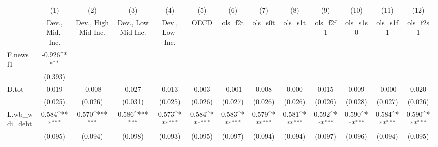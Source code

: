 {
\def\sym#1{\ifmmode^{#1}\else\(^{#1}\)\fi}
\begin{tabular}{l*{12}{c}}
\toprule
            &\multicolumn{1}{c}{(1)}&\multicolumn{1}{c}{(2)}&\multicolumn{1}{c}{(3)}&\multicolumn{1}{c}{(4)}&\multicolumn{1}{c}{(5)}&\multicolumn{1}{c}{(6)}&\multicolumn{1}{c}{(7)}&\multicolumn{1}{c}{(8)}&\multicolumn{1}{c}{(9)}&\multicolumn{1}{c}{(10)}&\multicolumn{1}{c}{(11)}&\multicolumn{1}{c}{(12)}\\
            &\multicolumn{1}{c}{Dev., Mid.-Inc.}&\multicolumn{1}{c}{Dev., High Mid-Inc.}&\multicolumn{1}{c}{Dev., Low Mid-Inc.}&\multicolumn{1}{c}{Dev., Low-Inc.}&\multicolumn{1}{c}{OECD}&\multicolumn{1}{c}{ols\_f2t}&\multicolumn{1}{c}{ols\_s0t}&\multicolumn{1}{c}{ols\_s1t}&\multicolumn{1}{c}{ols\_f2f1}&\multicolumn{1}{c}{ols\_s1s0}&\multicolumn{1}{c}{ols\_s1f1}&\multicolumn{1}{c}{ols\_f2s1}\\
\midrule
F.news\_f1   &      -0.926\sym{**} &                     &                     &                     &                     &                     &                     &                     &                     &                     &                     &                     \\
            &     (0.393)         &                     &                     &                     &                     &                     &                     &                     &                     &                     &                     &                     \\
\addlinespace
D.tot       &       0.019         &      -0.008         &       0.027         &       0.013         &       0.003         &      -0.001         &       0.008         &       0.000         &       0.015         &       0.009         &      -0.000         &       0.020         \\
            &     (0.025)         &     (0.026)         &     (0.031)         &     (0.025)         &     (0.026)         &     (0.027)         &     (0.026)         &     (0.026)         &     (0.026)         &     (0.028)         &     (0.027)         &     (0.026)         \\
\addlinespace
L.wb\_wdi\_debt&       0.584\sym{***}&       0.570\sym{***}&       0.586\sym{***}&       0.573\sym{***}&       0.584\sym{***}&       0.583\sym{***}&       0.579\sym{***}&       0.581\sym{***}&       0.592\sym{***}&       0.590\sym{***}&       0.584\sym{***}&       0.590\sym{***}\\
            &     (0.095)         &     (0.094)         &     (0.098)         &     (0.093)         &     (0.095)         &     (0.097)         &     (0.094)         &     (0.094)         &     (0.097)         &     (0.096)         &     (0.094)         &     (0.095)         \\

\end{tabular}}
